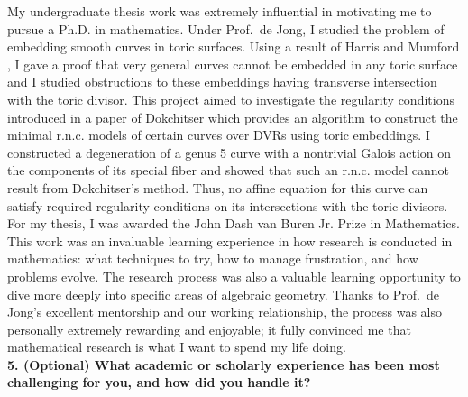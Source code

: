 \documentclass[11pt]{article}
\begin{document}
My undergraduate thesis work was extremely influential in motivating me to pursue a Ph.D. in mathematics. Under Prof.\ de Jong, I studied the problem of embedding smooth curves in toric surfaces. Using a result of Harris and Mumford , I gave a proof that very general curves cannot be embedded in any toric surface and I studied obstructions to these embeddings having transverse intersection with the toric divisor. This project aimed to investigate the regularity conditions introduced in a paper of Dokchitser  which provides an algorithm to construct the minimal r.n.c. models of certain curves over DVRs using toric embeddings. I constructed a degeneration of a genus 5 curve with a nontrivial Galois action on the components of its special fiber and showed that such an r.n.c. model cannot result from Dokchitser's method. Thus, no affine equation for this curve can satisfy required regularity conditions on its intersections with the toric divisors. For my thesis, I was awarded the John Dash van Buren Jr. Prize in Mathematics. This work was an invaluable learning experience in how research is conducted in mathematics: what techniques to try, how to manage frustration, and how problems evolve. The research process was also a valuable learning opportunity to dive more deeply into specific areas of algebraic geometry. Thanks to Prof.\ de Jong’s excellent mentorship and our working relationship, the process was also personally extremely rewarding and enjoyable; it fully convinced me that mathematical research is what I want to spend my life doing. 
\bigskip\\
\noindent \textbf{5. (Optional) What academic or scholarly experience has been most challenging for you, and how did you handle it?}
\bigskip\\
\end{document}
